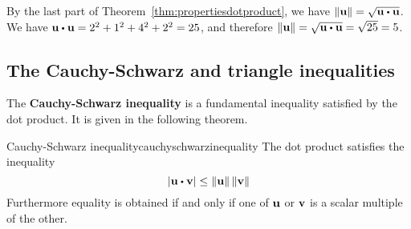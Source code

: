 \begin{solution}
  By the last part of Theorem~\ref{thm:propertiesdotproduct}, we have
  $\norm{\vect{u}} = \sqrt {\vect{u} \dotprod \vect{u}}$. We have
  $\vect{u} \dotprod \vect{u} = 2^2+1^2+4^2+2^2 = 25$, and therefore
  $\norm{\vect{u}} = \sqrt{\vect{u} \dotprod \vect{u}} = \sqrt{25} = 5$.
\end{solution}

\subsection{The Cauchy-Schwarz and triangle inequalities}

The \textbf{Cauchy-Schwarz inequality}
is a fundamental inequality satisfied by the dot product.  It is given
in the following theorem.

\begin{theorem}{Cauchy-Schwarz inequality}{cauchyschwarzinequality}
  The dot product satisfies the inequality
  \begin{equation}\label{cauchy}
    \abs{\vect{u}\dotprod \vect{v}}\leq \norm{\vect{u}} \norm{\vect{v}}
  \end{equation}
  Furthermore equality is obtained if and only if one of $\mbox{\bf u}$ or $\mbox{\bf v}$ is a scalar multiple of the other.
\end{theorem}

